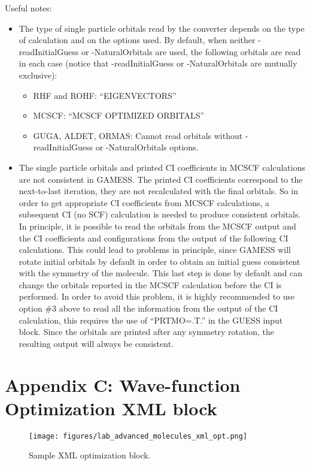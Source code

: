 Useful notes:
\begin{itemize}
  \item{The type of single particle orbitals read by the converter depends on the type of
calculation and on the options used. By default, when neither -readInitialGuess or
-NaturalOrbitals are used, the following orbitals are read in each case (notice that
-readInitialGuess or -NaturalOrbitals are mutually exclusive):}
  \begin{itemize}
    \item{RHF and ROHF: “EIGENVECTORS”}
    \item{MCSCF: “MCSCF OPTIMIZED ORBITALS”}
    \item{GUGA, ALDET, ORMAS: Cannot read orbitals without -readInitialGuess or -NaturalOrbitals options.}
  \end{itemize}
  \item{The single particle orbitals and printed CI coefficients in MCSCF calculations are
not consistent in GAMESS. The printed CI coefficients correspond to the next-to-last
iteration, they are not recalculated with the final orbitals. So in order to get appropriate 
CI coefficients from MCSCF calculations, a subsequent CI (no SCF) calculation
is needed to produce consistent orbitals. In principle, it is possible to read the orbitals 
from the MCSCF output and the CI coefficients and configurations from the
output of the following CI calculations. This could lead to problems in principle, since
GAMESS will rotate initial orbitals by default in order to obtain an initial guess consistent 
with the symmetry of the molecule. This last step is done by default and can
change the orbitals reported in the MCSCF calculation before the CI is performed.
In order to avoid this problem, it is highly recommended to use option \#3 above to
read all the information from the output of the CI calculation, this requires the use
of “PRTMO=.T.” in the GUESS input block. Since the orbitals are printed after any
symmetry rotation, the resulting output will always be consistent.}
\end{itemize}


\newpage
\section{Appendix C: Wave-function Optimization XML block}

\begin{figure}[ht!]
\begin{center}
\texttt{[image: figures/lab\_advanced\_molecules\_xml\_opt.png]}
\end{center}
\caption{Sample XML optimization block.
\label{fig:lam_xml_opt}
}
\end{figure}

